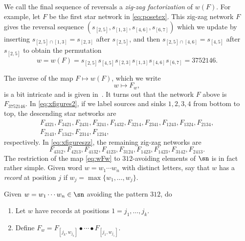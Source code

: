 We call the final sequence of reversals a
{\em zig-zag factorization} of $w(F)$.
For example, let $F$ be the first star network in \eqref{eq:posetex}.
This zig-zag network $F$ gives the
reversal sequence $(s_{[2,5]}, s_{[1,3]}, s_{[4,6]}, s_{[6,7]})$ which we update
by inserting $s_{[2,5] \cap [1,3]} = s_{[2,3]}$ after $s_{[2,5]}$, and then
$s_{[2,5] \cap [4,6]} = s_{[4,5]}$ after $s_{[2,5]}$ to obtain
the permutation
\begin{equation*}
  w = w(F) = s_{[2,5]}s_{[4,5]}s_{[2,3]}s_{[1,3]}s_{[4,6]}s_{[6,7]} = 3752146.
  \end{equation*}

The inverse of the map $F \mapsto w(F)$,
which we write
\begin{equation}\label{eq:wFw}
  w \mapsto F_w,
\end{equation}
is a bit intricate and is given in~\cite[\S 3]{SkanNNDCB}.
It turns out that the network $F$ above is $F_{3752146}$.
In \eqref{eq:xfigures2}, if we label sources and sinks $1, 2, 3, 4$ from bottom
to top, the descending star networks are
\begin{equation}\label{eq:dsnlist}
  \begin{gathered}
  F_{4321}, F_{3421}, F_{2431}, F_{3241}, F_{1432}, F_{3214}, F_{2341}, F_{1243}, F_{1324}, F_{2134}, \\
  F_{2143}, F_{1342}, F_{2314}, F_{1234},
  \end{gathered}
\end{equation}
respectively.
In \eqref{eq:xfigureszz}, the remaining zig-zag networks are
\begin{equation}\label{eq:zzlist}
  F_{4312}, F_{4213}, F_{4132}, F_{4123}, F_{3124}, F_{1423}, F_{1423}, F_{3142}, F_{2413}.
  \end{equation}
The restriction of the map \eqref{eq:wFw} to $312$-avoiding elements of $\sn$
is in fact rather simple.  Given word $w = w_1 \cdots w_n$
with distinct letters,
say that $w$ has a {\em record} at position $j$
if $w_j = \max\{ w_1, \dotsc, w_j \}$.

\begin{alg}\label{a:wFw}
  Given $w = w_1 \cdots w_n \in \sn$ avoiding the pattern $312$, do
  \begin{enumerate}
  \item Let $w$ have records at positions $1 = j_1, \dotsc, j_k$.
  \item Define
    $F_w = F_{[j_k,w_{j_k}]}
    \bullet \cdots \bullet F_{[j_1,w_{j_1}]}$.
  \end{enumerate}
\end{alg}

